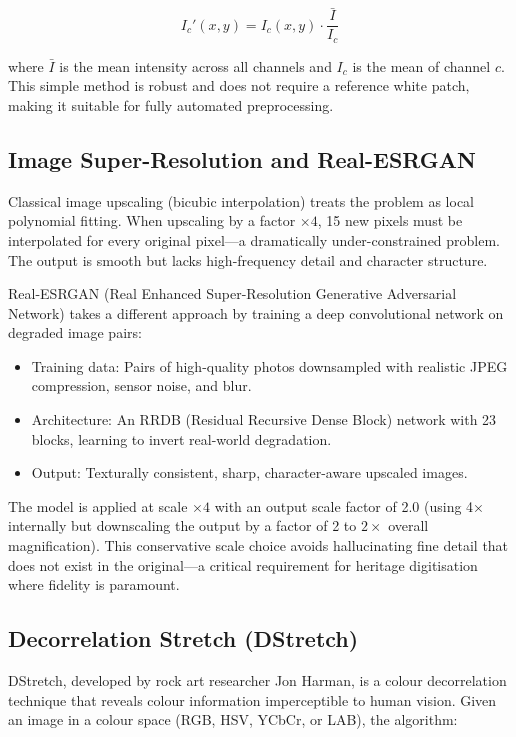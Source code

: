 \begin{equation}
I_c'(x,y) = I_c(x,y) \cdot \frac{\bar{I}}{I_c}
\end{equation}

where $\bar{I}$ is the mean intensity across all channels and $I_c$ is the mean of channel $c$. This simple method is robust and does not require a reference white patch, making it suitable for fully automated preprocessing.

\subsection{Image Super-Resolution and Real-ESRGAN}\label{sec:realesrgan}

Classical image upscaling (bicubic interpolation) treats the problem as local polynomial fitting. When upscaling by a factor $\times 4$, 15 new pixels must be interpolated for every original pixel—a dramatically under-constrained problem. The output is smooth but lacks high-frequency detail and character structure.

Real-ESRGAN (Real Enhanced Super-Resolution Generative Adversarial Network) takes a different approach by training a deep convolutional network on degraded image pairs:

\begin{itemize}
	\item Training data: Pairs of high-quality photos downsampled with realistic JPEG compression, sensor noise, and blur.
	\item Architecture: An RRDB (Residual Recursive Dense Block) network with 23 blocks, learning to invert real-world degradation.
	\item Output: Texturally consistent, sharp, character-aware upscaled images.
\end{itemize}

The model is applied at scale $\times 4$ with an output scale factor of 2.0 (using 4× internally but downscaling the output by a factor of 2 to $2 \times$ overall magnification). This conservative scale choice avoids hallucinating fine detail that does not exist in the original—a critical requirement for heritage digitisation where fidelity is paramount.

\subsection{Decorrelation Stretch (DStretch)}\label{sec:dstretch}

DStretch, developed by rock art researcher Jon Harman, is a colour decorrelation technique that reveals colour information imperceptible to human vision. Given an image in a colour space (RGB, HSV, YCbCr, or LAB), the algorithm:


